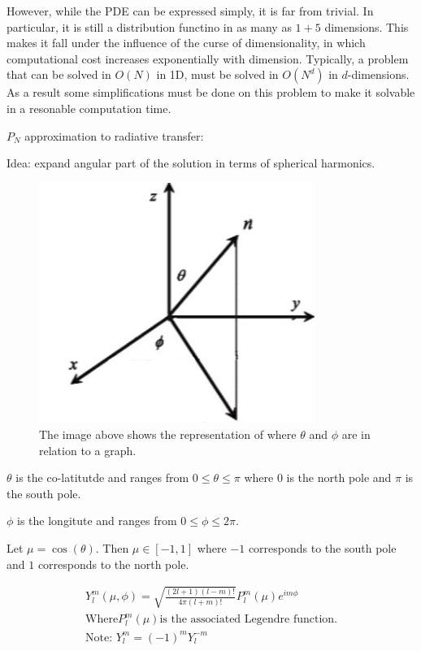 \documentclass[12pt]{article}
\begin{document}
However, while the PDE can be expressed simply, it is far from trivial. 
In particular, it is still a distribution functino in as many as $ 1 + 5$ dimensions.
This makes it fall under the influence of the curse of dimensionality, in which computational cost increases exponentially with dimension.
Typically, a problem that can be solved in $O(N)$ in 1D, must be solved in $O(N^d)$ in $d$-dimensions.
As a result some simplifications must be done on this problem to make it solvable in a resonable computation time.

$P_N$ approximation to radiative transfer:

Idea: expand angular part of the solution in terms of spherical harmonics.

\begin{figure}[H]
\centering
\includegraphics[width=0.8\textwidth]{spherical_harmonics_graph.jpg}
\caption{The image above shows the representation of where $\theta$ and $\phi$ are in relation to a graph.}
\end{figure}

$\theta$ is the co-latitutde and ranges from $0 \leq \theta \leq \pi$ where $0$ is the north pole and $\pi$ is the south pole. 

$\phi$ is the longitute and ranges from $0 \leq \phi \leq 2\pi$.

Let $\mu = \cos(\theta)$. Then $\mu \in [-1,1]$ where $-1$ corresponds to the south pole and $1$ corresponds to the north pole.

\begin{align*}
Y^m _l (\mu, \phi) = \sqrt{\frac{(2l+1)(l-m)!}{4\pi (l+m)!}} P^m _l (\mu) e^{im\phi} \\
\text{Where} P^m _l (\mu) \text{is the associated Legendre function.} \\
\text{Note: } Y^m _l = (-1)^m Y^{-m} _l \\
\end{align*}
\end{document}
